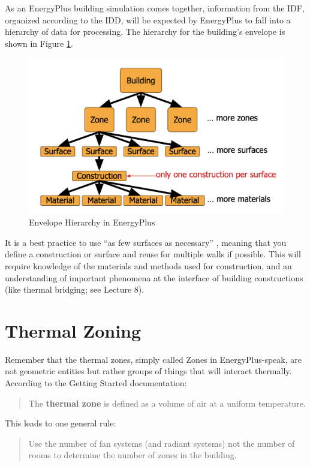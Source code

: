 \documentclass[10pt]{article}
\begin{document}
As an EnergyPlus building simulation comes together, information from the IDF, organized according to the IDD, will be expected by EnergyPlus to fall into a hierarchy of data for processing. The hierarchy for the building's envelope is shown in Figure \ref{hierarchy}.

\begin{figure}[h]
\centering
\includegraphics[width=4.5in]{extras12/envelopehierarchy.png}
\caption{Envelope Hierarchy in EnergyPlus \cite{EPcourseteaching}}
\label{hierarchy}
\end{figure}

It is a best practice to use ``as few surfaces as necessary'' \cite{EPcourseteaching}, meaning that you define a construction or surface and reuse for multiple walls if possible. This will require knowledge of the materials and methods used for construction, and an understanding of important phenomena at the interface of building constructions (like thermal bridging; see Lecture 8).

\section{Thermal Zoning}

Remember that the thermal zones, simply called Zones in EnergyPlus-speak, are not geometric entities but rather groups of things that will interact thermally. According to the Getting Started documentation:

\begin{quote}
    The \textbf{thermal zone} is defined as a volume of air at a uniform temperature. \cite{EPdocs9gettingstarted}
\end{quote} 

This leads to one general rule: 

\begin{quote}
Use the number of fan systems (and radiant systems) not the number of rooms to determine the
number of zones in the building. \cite{EPdocs9gettingstarted}
\end{quote}
\end{document}
